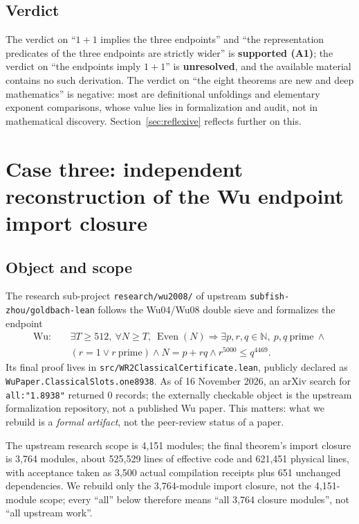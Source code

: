 \documentclass[11pt,a4paper]{article}
\theoremstyle{plain}
\theoremstyle{definition}
\newcommand{\WU}{\mathrm{Wu}}
\newcommand{\Even}{\operatorname{Even}}
\newcommand{\N}{\mathbb{N}}
\begin{document}
\subsection{Verdict}
\label{sec:endpoints-verdict}

The verdict on ``$1+1$ implies the three endpoints'' and ``the representation predicates of the three endpoints are strictly wider'' is \textbf{supported (A1)}; the verdict on ``the endpoints imply $1+1$'' is \textbf{unresolved}, and the available material contains no such derivation. The verdict on ``the eight theorems are new and deep mathematics'' is negative: most are definitional unfoldings and elementary exponent comparisons, whose value lies in formalization and audit, not in mathematical discovery. Section~\ref{sec:reflexive} reflects further on this.

\section{Case three: independent reconstruction of the Wu endpoint import closure}
\label{sec:wu}

\subsection{Object and scope}
\label{sec:wu-object}

The research sub-project \texttt{research/wu2008/} of upstream \texttt{subfish-zhou/goldbach-lean} follows the Wu04/Wu08 double sieve and formalizes the endpoint
\begin{equation}
\begin{aligned}
\WU:\quad &\exists T\ge512,\ \forall N\ge T,\ \Even(N)\Longrightarrow
\exists p,r,q\in\N,\ p,q\ \text{prime}\ \land\\
&(r=1\lor r\ \text{prime})\land N=p+rq\land r^{5000}\le q^{4469}.
\end{aligned}
\label{eq:wu}
\end{equation}
Its final proof lives in \texttt{src/WR2ClassicalCertificate.lean}, publicly declared as \texttt{WuPaper.ClassicalSlots.one8938}. As of 16 November 2026, an arXiv search for \texttt{all:"1.8938"} returned 0 records; the externally checkable object is the upstream formalization repository, not a published Wu paper. This matters: what we rebuild is a \emph{formal artifact}, not the peer-review status of a paper.

The upstream research scope is 4,151 modules; the final theorem's import closure is 3,764 modules, about 525,529 lines of effective code and 621,451 physical lines, with acceptance taken as 3,500 actual compilation receipts plus 651 unchanged dependencies\cite{upstream}. We rebuild only the 3,764-module import closure, not the 4,151-module scope; every ``all'' below therefore means ``all 3,764 closure modules'', not ``all upstream work''.
\end{document}
